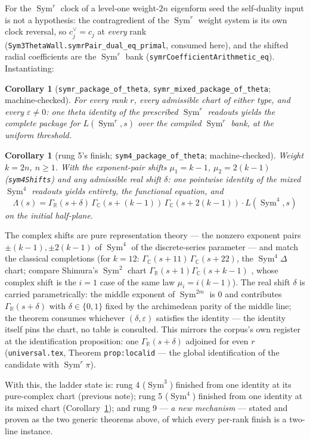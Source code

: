 \documentclass[11pt]{article}
\newtheorem{corollary}[theorem]{Corollary}
\newcommand{\Sym}{\operatorname{Sym}}
\newcommand{\Gm}{\Gamma_{\mathbb C}}
\newcommand{\Gr}{\Gamma_{\mathbb R}}
\begin{document}
For the $\Sym^r$ clock of a level-one weight-$2n$ eigenform seed the self-duality
input is not a hypothesis: the contragredient of the $\Sym^r$ weight system is its own
clock reversal, so $c^\vee_j=c_j$ at \emph{every} rank
(\texttt{Sym3ThetaWall.symrPair\_dual\_eq\_primal}, consumed here), and the shifted
radial coefficients are the $\Sym^r$ bank
(\texttt{symrCoefficientArithmetic\_eq}).  Instantiating:

\begin{corollary}[\texttt{symr\_package\_of\_theta},
\texttt{symr\_mixed\_package\_of\_theta}; machine-checked]
For every rank $r$, every admissible chart of either type, and every
$\varepsilon\neq0$: one theta identity of the prescribed $\Sym^r$ readouts yields the
complete package for $L(\Sym^r\!,s)$ over the compiled $\Sym^r$ bank, at the uniform
threshold.
\end{corollary}

\begin{corollary}[rung 5's finish; \texttt{sym4\_package\_of\_theta}; machine-checked]
\label{cor:sym4}
Weight $k=2n$, $n\ge1$.  With the exponent-pair shifts
$\mu_1=k-1$, $\mu_2=2(k-1)$ (\texttt{sym4Shifts}) and any admissible real shift
$\delta$: one pointwise identity of the mixed $\Sym^4$ readouts yields entirety, the
functional equation, and
\[
\Lambda(s)=\Gr(s+\delta)\,\Gm(s+(k-1))\,\Gm(s+2(k-1))\cdot L(\Sym^4\!,s)
\]
on the initial half-plane.
\end{corollary}

The complex shifts are pure representation theory --- the nonzero exponent pairs
$\pm(k-1),\pm2(k-1)$ of $\Sym^4$ of the discrete-series parameter --- and match the
classical completions (for $k=12$: $\Gm(s+11)\,\Gm(s+22)$, the $\Sym^4\Delta$ chart;
compare Shimura's $\Sym^2$ chart $\Gr(s+1)\Gm(s+k-1)$ \cite{Shimura}, whose complex
shift is the $i=1$ case of the same law $\mu_i=i(k-1)$).  The real shift $\delta$ is
carried parametrically: the middle exponent of $\Sym^{2m}$ is $0$ and contributes
$\Gr(s+\delta)$ with $\delta\in\{0,1\}$ fixed by the archimedean parity of the middle
line; the theorem consumes whichever $(\delta,\varepsilon)$ satisfies the identity ---
the identity itself pins the chart, no table is consulted.  This mirrors the corpus's
own register at the identification proposition: one $\Gr(s+\delta)$ adjoined for even
$r$ (\texttt{universal.tex}, Theorem \texttt{prop:localid} --- the global
identification of the candidate with $\Sym^r\pi$).

With this, the ladder state is: rung 4 ($\Sym^3$) finished from one identity at its
pure-complex chart (previous note); rung 5 ($\Sym^4$) finished from one identity at its
mixed chart (Corollary~\ref{cor:sym4}); and rung 9 --- \emph{a new mechanism} ---
stated and proven as the two generic theorems above, of which every per-rank finish is
a two-line instance.
\end{document}
